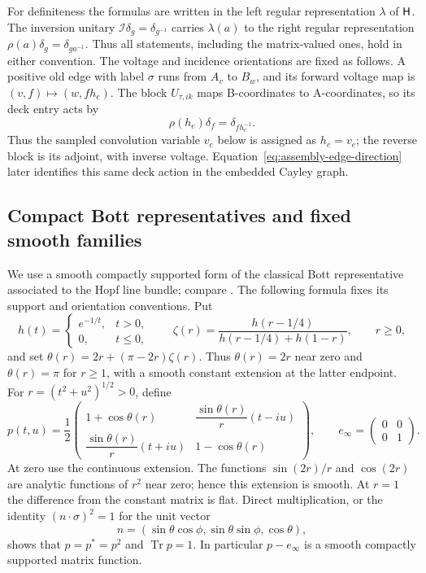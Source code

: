 For definiteness the formulas are written in the left regular representation
\(\lambda\) of \(\mathsf H\).  The inversion unitary
\(\mathcal I\delta_g=\delta_{g^{-1}}\) carries \(\lambda(a)\) to the right
regular representation \(\rho(a)\delta_g=\delta_{ga^{-1}}\).  Thus all statements,
including the matrix-valued ones, hold in either convention.  The voltage
and incidence orientations are fixed as follows.  A positive old edge with
label \(\sigma\) runs from \(A_v\) to \(B_w\), and its forward voltage map is
\((v,f)\mapsto(w,fh_e)\).  The block \(U_{\tau,ik}\) maps B-coordinates to
A-coordinates, so its deck entry acts by
\[
 \rho(h_e)\delta_f=\delta_{fh_e^{-1}}.
\]
Thus the sampled convolution variable \(v_e\) below is assigned as
\(h_e=v_e\); the reverse block is its adjoint, with inverse voltage.
Equation~\eqref{eq:assembly-edge-direction} later identifies this same
deck action in the embedded Cayley graph.

\subsection{Compact Bott representatives and fixed smooth families}

We use a smooth compactly supported form of the classical Bott representative
associated to the Hopf line bundle; compare \cite[Section~2]{AB64}.
The following formula fixes its support and orientation conventions.  Put
\[
 h(t)=\begin{cases}e^{-1/t},&t>0,\\0,&t\leq0,\end{cases}
 \qquad
 \zeta(r)=\frac{h(r-1/4)}{h(r-1/4)+h(1-r)},\qquad r\geq0,
\]
and set \(\theta(r)=2r+(\pi-2r)\zeta(r)\).  Thus \(\theta(r)=2r\) near zero and
\(\theta(r)=\pi\) for \(r\geq1\), with a smooth constant extension at the latter
endpoint.  For \(r=(t^2+u^2)^{1/2}>0\), define
\begin{equation}
\label{eq:compact-bott-profile}
 p(t,u)=\frac12
 \begin{pmatrix}
 1+\cos\theta(r)&\dfrac{\sin\theta(r)}{r}(t-iu)\\[3pt]
 \dfrac{\sin\theta(r)}{r}(t+iu)&1-\cos\theta(r)
 \end{pmatrix},
 \qquad e_\infty=\begin{pmatrix}0&0\\0&1\end{pmatrix}.
\end{equation}
At zero use the continuous extension.  The functions
\(\sin(2r)/r\) and \(\cos(2r)\) are analytic functions of \(r^2\) near zero;
hence this extension is smooth.  At \(r=1\) the difference from the constant
matrix is flat.  Direct multiplication, or the identity
\((n\cdot\sigma)^2=1\) for the unit vector
\[
 n=(\sin\theta\cos\phi,\sin\theta\sin\phi,\cos\theta),
\]
shows that \(p=p^*=p^2\) and \(\operatorname{Tr}p=1\).  In particular
\(p-e_\infty\) is a smooth compactly supported matrix function.

